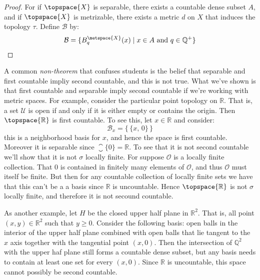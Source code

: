 \documentclass{book}                                                           %
\begin{document}
            \begin{proof}
                For if $\topspace{X}$ is separable, there exists a countable dense
                subset $A$, and if $\topspace{X}$ is metrizable, there exists a
                metric $d$ on $X$ that induces the topology $\tau$. Define
                $\mathcal{B}$ by:
                \begin{equation}
                    \mathcal{B}=
                        \{B_{q}^{\metspace{X}}(x)\;|\;
                            x\in{A}\textrm{ and }q\in\mathbb{Q^{+}}\}
                \end{equation}
            \end{proof}
            \begin{example}
                A common \textit{non-theorem} that confuses students is the belief
                that separable and first countable impliy second countable, and this
                is not true. What we've shown is that first countable and separable
                imply second countable if we're working with metric spaces. For
                example, consider the particular point topology on $\mathbb{R}$.
                That is, a set $\mathcal{U}$ is open if and only if it is either
                empty or contains the origin. Then $\topspace{\mathbb{R}}$ is
                first countable. To see this, let $x\in\mathbb{R}$ and consider:
                \begin{equation}
                    \mathcal{B}_{x}=\big\{\,\{x,\,0\}\,\big\}
                \end{equation}
                this is a neighborhood basis for $x$, and hence the space is first
                countable. Moreover it is separable since
                $\closure{\{0\}}=\mathbb{R}$. To see that it is not second countable
                we'll show that it is not $\sigma$ locally finite. For suppose
                $\mathcal{O}$ is a locally finite collection. That $0$ is contained
                in finitely many elements of $\mathcal{O}$, and thus $\mathcal{O}$
                must itself be finite. But then for any countable collection of
                locally finite sets we have that this can't be a a basis since
                $\mathbb{R}$ is uncountable. Hence $\topspace{\mathbb{R}}$ is not
                $\sigma$ locally finite, and therefore it is not secound countable.
            \end{example}
            \begin{example}
                As another example, let $H$ be the closed upper half plane in
                $\mathbb{R}^{2}$. That is, all point $(x,y)\in\mathbb{R}^{2}$ such
                that $y\geq{0}$. Consider the following basis: open balls in the
                interior of the upper half plane combined with open balls that lie
                tangent to the $x$ axis together with the tangential point $(x,0)$.
                Then the intersection of $\mathbb{Q}^{2}$ with the upper haf plane
                still forms a countable dense subset, but any basis needs to contain
                at least one set for every $(x,0)$. Since $\mathbb{R}$ is
                uncountable, this space cannot possibly be second countable.
            \end{example}
\end{document}
